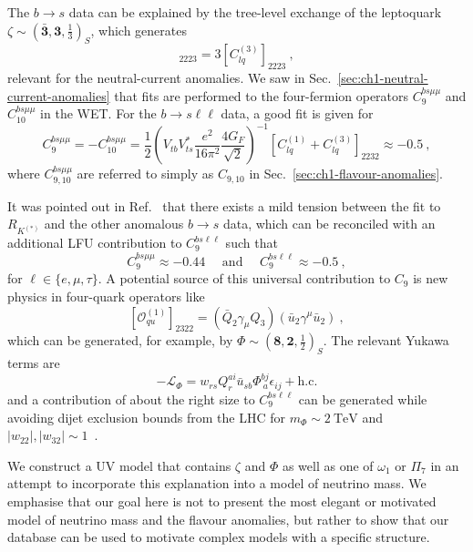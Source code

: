 The $b \to s$ data can be explained by the tree-level exchange of the leptoquark
$\zeta \sim (\mathbf{\bar{3}}, \mathbf{3}, \tfrac{1}{3})_{S}$, which generates
\begin{equation}
  [C_{lq}^{(1)}]_{2223} = 3 [C_{lq}^{(3)}]_{2223} \ ,
\end{equation}
relevant for the neutral-current anomalies. We saw in
Sec.~\ref{sec:ch1-neutral-current-anomalies} that fits are performed to the
four-fermion operators $C^{bs\mu\mu}_{9}$ and $C^{bs\mu\mu}_{10}$ in the WET.
For the $b \to s \ell \ell$ data, a good fit is given
for~\cite{Aebischer:2019mlg}
\begin{equation}
  C_{9}^{bs\mu\mu} = - C_{10}^{bs\mu\mu} = \frac{1}{2} \left(  V_{tb} V_{ts}^{*} \frac{e^{2}}{16\pi^{2}} \frac{4 G_{F}}{\sqrt{2}} \right)^{-1} \left[ C_{lq}^{(1)} + C_{lq}^{(3)} \right]_{2232} \approx -0.5 \ ,
\end{equation}
where $C_{9,10}^{bs\mu\mu}$ are referred to simply as $C_{9,10}$ in
Sec.~\ref{sec:ch1-flavour-anomalies}.

It was pointed out in Ref.~\cite{Aebischer:2019mlg} that there exists a mild
tension between the fit to $R_{K^{(*)}}$ and the other anomalous $b \to s$ data,
which can be reconciled with an additional LFU contribution to
$C_{9}^{bs\ell\ell}$ such that
\begin{equation}
  C_{9}^{bs\mu\mu} \approx -0.44\quad \text{ and }\quad C_{9}^{bs\ell\ell} \approx -0.5 \ ,
\end{equation}
for $\ell \in \{e, \mu, \tau\}$. A potential source of this universal
contribution to $C_{9}$ is new physics in four-quark operators
like~\cite{Aebischer:2019mlg}
\begin{equation}
  \label{eq:ch2-ouq}
  [\mathcal{O}_{qu}^{(1)}]_{2322} = (\bar{Q}_{2} \gamma_{\mu} Q_{3}) (\bar{u}_{2} \gamma^{\mu} \bar{u}_{2}) \ ,
\end{equation}
which can be generated, for example, by
$\Phi \sim (\mathbf{8}, \mathbf{2}, \tfrac{1}{2})_{S}$. The relevant Yukawa terms are
\begin{equation}
  \label{eq:ch2-phi-yuks}
  - \mathscr{L}_{\Phi} = w_{rs} Q_{r}^{ai} \bar{u}_{sb} \Phi^{bj}_{\ a} \epsilon_{ij} + \text{h.c.}
\end{equation}
and a contribution of about the right size to $C_{9}^{bs\ell\ell}$ can be
generated while avoiding dijet exclusion bounds from the LHC for
$m_{\Phi} \sim \SI{2}{\TeV}$ and
$|w_{22}|, |w_{32}| \sim 1$~\cite{Aebischer:2019mlg}.

We construct a UV model that contains $\zeta$ and $\Phi$ as well as one of
$\omega_{1}$ or $\Pi_{7}$ in an attempt to incorporate this explanation into a
model of neutrino mass. We emphasise that our goal here is not to present the
most elegant or motivated model of neutrino mass and the flavour anomalies, but
rather to show that our database can be used to motivate complex models with a
specific structure.

